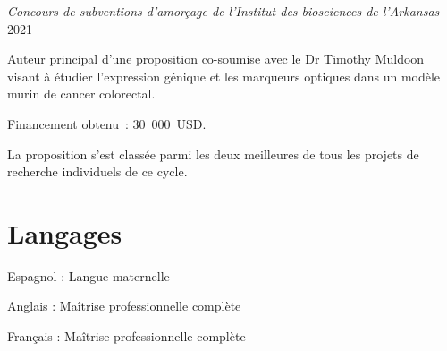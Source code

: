 \documentclass[10pt,]{article}
\renewenvironment{itemize}{
  \begin{list}{}{
    \setlength{\leftmargin}{1.5em}
  }
}{
  \end{list}
}
\begin{document}
\emph{Concours de subventions d'amorçage de l'Institut des biosciences
de l'Arkansas} \hfill 2021

Auteur principal d'une proposition co-soumise avec le Dr Timothy Muldoon
visant à étudier l'expression génique et les marqueurs optiques dans un
modèle murin de cancer colorectal.

Financement obtenu~: 30~000~USD.

La proposition s'est classée parmi les deux meilleures de tous les
projets de recherche individuels de ce cycle.

\section{Langages}\label{langages}

\begin{itemize}
\item
  Espagnol : Langue maternelle
\item
  Anglais : Maîtrise professionnelle complète
\item
  Français : Maîtrise professionnelle complète
\end{itemize}
\end{document}
